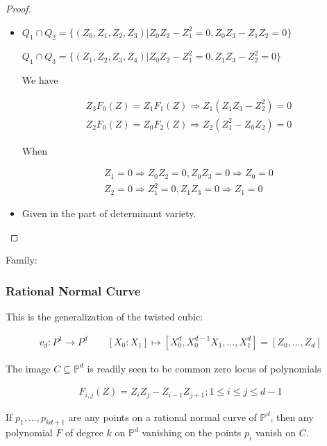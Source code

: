 \documentclass[Total.tex]{subfiles}
\begin{document}
			\begin{proof}
				\begin{itemize}
					\item $Q_1\cap Q_2=\{(Z_0,Z_1,Z_2,Z_3)|Z_0Z_2-Z_1^2=0,Z_0Z_3-Z_1Z_2=0\}$
					
					$Q_1\cap Q_3=\{(Z_1,Z_2,Z_3,Z_4)|Z_0Z_2-Z_1^2=0,Z_1Z_3-Z_2^2=0\}$
					
					We have
					
					\begin{gather*}
						Z_3F_0(Z)=Z_1 F_1(Z)\Rightarrow Z_1(Z_1Z_3-Z_2^2)=0\\
						Z_2F_0(Z)=Z_0F_2(Z)\Rightarrow Z_2(Z_1^2-Z_0Z_2)=0
					\end{gather*}
					
					When
					
					\begin{gather*}
						Z_1=0\Rightarrow Z_0Z_2=0,Z_0Z_3=0\Rightarrow Z_0=0\\
						Z_2=0\Rightarrow Z_1^2=0,Z_1Z_3=0\Rightarrow  Z_1=0
					\end{gather*}
					
					\item Given in the part of determinant variety.
				\end{itemize}
			\end{proof}
			
			Family: 
			
			\subsubsection{Rational Normal Curve}
			
			\begin{Def}
				This is the generalization of the twisted cubic:
				
				\begin{gather*}
					v_d:P^1\rightarrow P^d\qquad [X_0:X_1]\mapsto [X_0^d,X_0^{d-1}X_1,\dots,X_1^d]=[Z_0,\dots,Z_d]
				\end{gather*}
				
				The image $C\subseteq \mathbb{P}^d$ is readily seen to be common zero locus of polynomials
				
				\begin{gather*}
					F_{i,j}(Z)=Z_iZ_j-Z_{i-1}Z_{j+1};1\leq i\leq j\leq d-1
				\end{gather*}
			\end{Def}
			
			\begin{proposition}
				If $p_1,\dots,p_{kd+1}$ are any points on a rational normal curve of $\mathbb{P}^d$, then any polynomial $F$ of degree $k$ on $\mathbb{P}^d$ vanishing on the points $p_i$ vanish on $C$.
				
				\label{classical-algebraic-geometry-Fundamentals-rational-normal-curve-1}
			\end{proposition}
			
\end{document}
